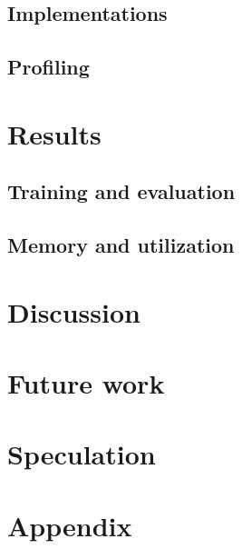\documentclass[sigconf]{acmart}
\begin{document}
\subsection{Implementations}\label{subsec:implementations}

\subsection{Profiling}\label{subsec:profiling}

\section{Results}\label{sec:results}

\subsection{Training and evaluation}\label{subsec:training-and-evaluation}

\subsection{Memory and utilization}\label{subsec:memory-and-utilization}

\section{Discussion}\label{sec:discussion}

\section{Future work}\label{sec:futurework}
\section{Speculation}\label{sec:speculation}




\appendix
\appendixpage
\addappheadtotoc

\section{Appendix}\label{sec:appendix}

%
\end{document}
